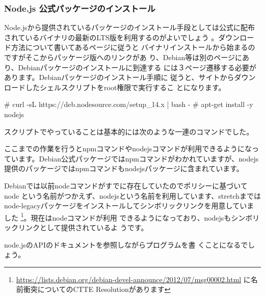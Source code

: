 \documentclass[mingoth,a4paper]{jsarticle}
\begin{document}
\subsubsection{Node.js 公式パッケージのインストール}

Node.jsから提供されているパッケージのインストール手段としては公式に配布
されているバイナリの最新のLTS版を利用するのがよいでしょう
\cite{nodejs-install}。ダウンロード方法について書いてあるページに従うと
バイナリインストールから始まるのですがそこからパッケージ版へのリンクがあ
り、Debian等は別のページにあり、Debianパッケージのインストールに到達する
には３ページ遷移する必要があります。Debianパッケージのインストール手順に
従うと、サイトからダウンロードしたシェルスクリプトをroot権限で実行するこ
とになります。

\begin{commandline}
# curl -sL https://deb.nodesource.com/setup_14.x | bash -
# apt-get install -y nodejs
\end{commandline}

スクリプトでやっていることは基本的には次のような一連のコマンドでした。


ここまでの作業を行うとnpmコマンドやnodejsコマンドが利用できるようになっ
ています。Debian公式パッケージではnpmコマンドがわかれていますが、nodejs
提供のパッケージではnpmコマンドもnodejsパッケージに含まれています。

Debianでは以前nodeコマンドがすでに存在していたのでポリシーに基づいてnode
という名前がつかえず、nodejsという名前を利用しています、stretchまでは
node-legacyパッケージをインストールしてシンボリックリンクを用意していま
した
\footnote{\url{https://lists.debian.org/debian-devel-announce/2012/07/msg00002.html}
に名前衝突についてのCTTE Resolutionがあります}。現在はnodeコマンドが利用
できるようになっており、nodejsもシンボリックリンクとして提供されているよ
うです。

node.jsのAPIのドキュメント\cite{nodejs-api}を参照しながらプログラムを書
くことになるでしょう。
\end{document}
